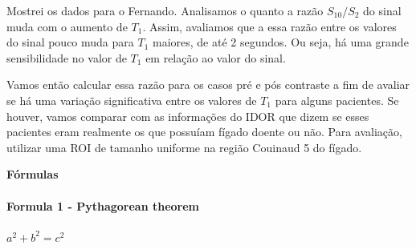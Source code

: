 \documentclass[idxtotoc,hyperref,openany]{labbook} %
\begin{document}


Mostrei os dados para o Fernando. Analisamos o quanto a razão $S_{10}/S_2$ do sinal muda com o aumento de $T_1$. Assim, avaliamos que a essa razão entre os valores do sinal pouco muda para $T_1$ maiores, de até 2 segundos. Ou seja, há uma grande sensibilidade no valor de $T_1$ em relação ao valor do sinal.

Vamos então calcular essa razão para os casos pré e pós contraste a fim de avaliar se há uma variação significativa entre os valores de $T_1$ para alguns pacientes. Se houver, vamos comparar com as informações do IDOR que dizem se esses pacientes eram realmente os que possuíam fígado doente ou não. Para avaliação, utilizar uma ROI de tamanho uniforme na região Couinaud 5 do fígado.  


\newpage

\huge \textbf{Fórmulas} \\ \\

\normalsize \textbf{Formula 1 - Pythagorean theorem}\\ \\
$a^2 + b^2 = c^2$\\ \\






\end{document}
